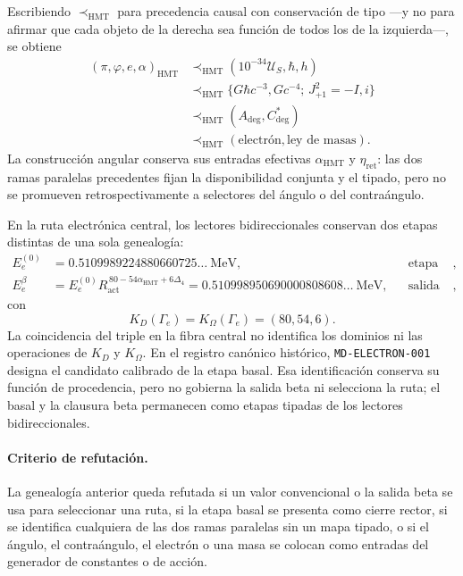 Escribiendo \(\prec_{\mathrm{HMT}}\) para precedencia causal con conservación
de tipo ---y no para afirmar que cada objeto de la derecha sea función de
todos los de la izquierda---, se obtiene
\[
\begin{aligned}
 (\pi,\varphi,e,\alpha)_{\mathrm{HMT}}
 &\prec_{\mathrm{HMT}}(10^{-34}\mathcal U_S,\hbar,h)\\
 &\prec_{\mathrm{HMT}}
 \bigl\{G\hbar c^{-3},Gc^{-4};\,J_{+1}^{2}=-I, i\bigr\}\\
 &\prec_{\mathrm{HMT}}(A_{\mathrm{deg}},C^{*}_{\mathrm{deg}})\\
 &\prec_{\mathrm{HMT}}(\text{electrón},\text{ley de masas}).
\end{aligned}
\]
La construcción angular conserva sus entradas efectivas
\(\alpha_{\mathrm{HMT}}\) y \(\eta_{\mathrm{ret}}\): las dos ramas paralelas
precedentes fijan la disponibilidad conjunta y el tipado, pero no se promueven
retrospectivamente a selectores del ángulo o del contraángulo.

En la ruta electrónica central, los lectores bidireccionales conservan dos
etapas distintas de una sola genealogía:
\[
 \begin{aligned}
 E_e^{(0)}
   &=0.5109989224880660725\ldots\ \mathrm{MeV},
   &&\text{etapa basal},\\
 E_e^{\beta}
   &=E_e^{(0)}R_{\mathrm{act}}^{\,80-54\alpha_{\mathrm{HMT}}+6\Delta_4}
     =0.510998950690000808608\ldots\ \mathrm{MeV},
   &&\text{salida beta rectora},
 \end{aligned}
\]
con
\[
 K_D(\Gamma_e)=K_{\Omega}(\Gamma_e)=(80,54,6).
\]
La coincidencia del triple en la fibra central no identifica los dominios ni
las operaciones de \(K_D\) y \(K_{\Omega}\). En el registro canónico
histórico, \texttt{MD-ELECTRON-001} designa el candidato calibrado de la etapa
basal. Esa identificación conserva su función de procedencia, pero no gobierna
la salida beta ni selecciona la ruta; el basal y la clausura beta permanecen
como etapas tipadas de los lectores bidireccionales.

\paragraph{Criterio de refutación.}
La genealogía anterior queda refutada si un valor convencional o la salida
beta se usa para seleccionar una ruta, si la etapa basal se presenta como
cierre rector, si se identifica cualquiera de las dos ramas paralelas sin un
mapa tipado, o si el ángulo, el contraángulo, el electrón o una masa se colocan
como entradas del generador de constantes o de acción.
